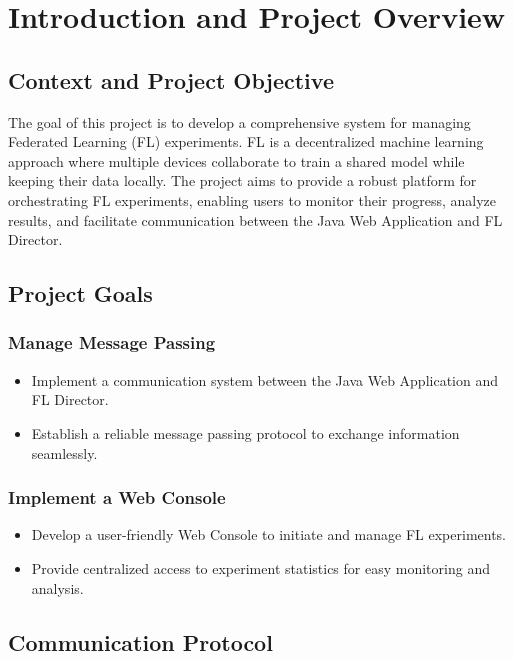 \chapter{Introduction and Project Overview}

\section{Context and Project Objective}

The goal of this project is to develop a comprehensive system for managing Federated Learning (FL) experiments. FL is a decentralized machine learning approach where multiple devices collaborate to train a shared model while keeping their data locally. The project aims to provide a robust platform for orchestrating FL experiments, enabling users to monitor their progress, analyze results, and facilitate communication between the Java Web Application and FL Director.

\section{Project Goals}

\subsection{Manage Message Passing}
\begin{itemize}
    \item Implement a communication system between the Java Web Application and FL Director.
    \item Establish a reliable message passing protocol to exchange information seamlessly.
\end{itemize}

\subsection{Implement a Web Console}
\begin{itemize}
    \item Develop a user-friendly Web Console to initiate and manage FL experiments.
    \item Provide centralized access to experiment statistics for easy monitoring and analysis.
\end{itemize}

\section{Communication Protocol}

